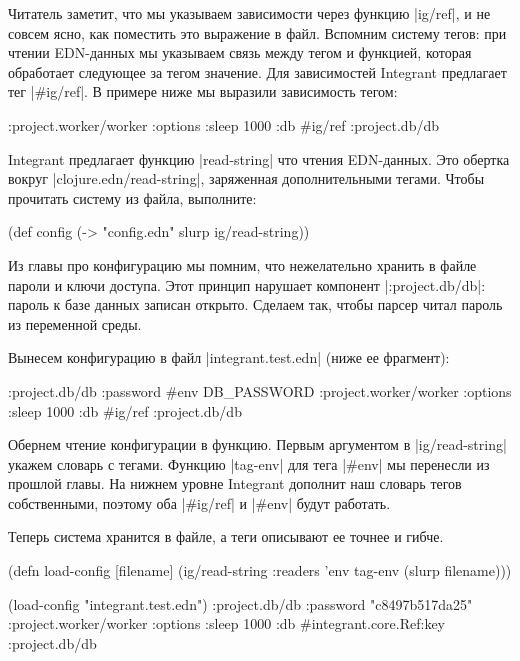Читатель заметит, что мы указываем зависимости через функцию \spverb|ig/ref|, и не
совсем ясно, как поместить это выражение в файл. Вспомним систему тегов: при
чтении EDN-данных мы указываем связь между тегом и функцией, которая обработает
следующее за тегом значение. Для зависимостей Integrant предлагает тег
\spverb|#ig/ref|. В примере ниже мы выразили зависимость тегом:

\begin{code}
{:project.worker/worker {:options {:sleep 1000}
                         :db #ig/ref :project.db/db}}
\end{code}

Integrant предлагает функцию \spverb|read-string| что чтения EDN-данных. Это обертка
вокруг \spverb|clojure.edn/read-string|, заряженная дополнительными тегами. Чтобы
прочитать систему из файла, выполните:

\begin{code}
(def config
  (-> "config.edn" slurp ig/read-string))
\end{code}

Из главы про конфигурацию мы помним, что нежелательно хранить в файле пароли и
ключи доступа. Этот принцип нарушает компонент \spverb|:project.db/db|: пароль к базе
данных записан открыто. Сделаем так, чтобы парсер читал пароль из переменной
среды.

Вынесем конфигурацию в файл \spverb|integrant.test.edn| (ниже ее фрагмент):

\begin{code}
{:project.db/db {:password #env DB_PASSWORD}
 :project.worker/worker {:options {:sleep 1000}
                         :db #ig/ref :project.db/db}}
\end{code}

Обернем чтение конфигурации в функцию. Первым аргументом в \spverb|ig/read-string|
укажем словарь с тегами. Функцию \spverb|tag-env| для тега \spverb|#env| мы перенесли из
прошлой главы. На нижнем уровне Integrant дополнит наш словарь тегов
собственными, поэтому оба \spverb|#ig/ref| и \spverb|#env| будут работать.

Теперь система хранится в файле, а теги описывают ее точнее и гибче.

\begin{code}
(defn load-config
  [filename]
  (ig/read-string {:readers {'env tag-env}}
                  (slurp filename)))

(load-config "integrant.test.edn")
{:project.db/db {:password "c8497b517da25"}
 :project.worker/worker {:options {:sleep 1000}
                         :db #integrant.core.Ref{:key :project.db/db}}}
\end{code}

